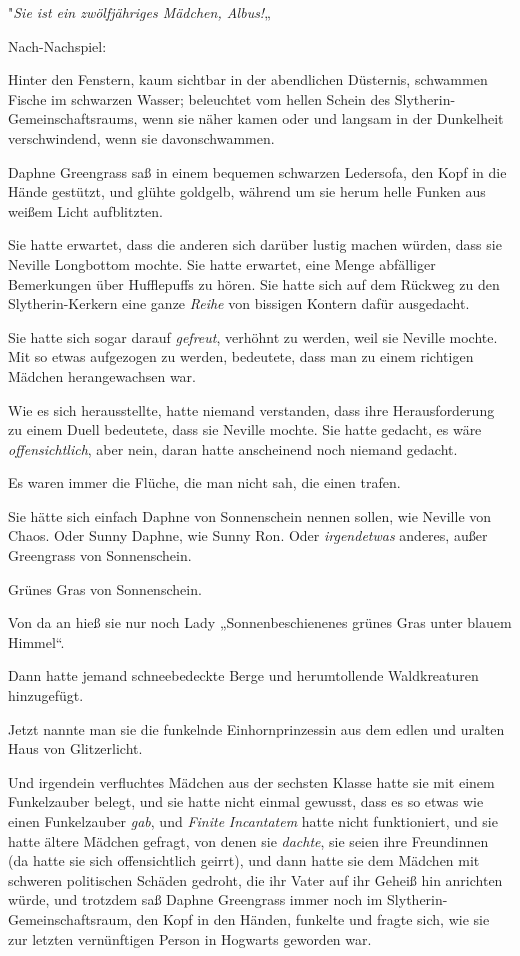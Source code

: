 {"\emph{Sie ist ein zwölfjähriges Mädchen, Albus!}„

Nach-Nachspiel:

Hinter den Fenstern, kaum sichtbar in der abendlichen Düsternis, schwammen Fische im schwarzen Wasser; beleuchtet vom hellen Schein des Slytherin-Gemeinschaftsraums, wenn sie näher kamen oder und langsam in der Dunkelheit verschwindend, wenn sie davonschwammen.

Daphne Greengrass saß in einem bequemen schwarzen Ledersofa, den Kopf in die Hände gestützt, und glühte goldgelb, während um sie herum helle Funken aus weißem Licht aufblitzten.

Sie hatte erwartet, dass die anderen sich darüber lustig machen würden, dass sie Neville Longbottom mochte. Sie hatte erwartet, eine Menge abfälliger Bemerkungen über Hufflepuffs zu hören. Sie hatte sich auf dem Rückweg zu den Slytherin-Kerkern eine ganze \emph{Reihe} von bissigen Kontern dafür ausgedacht.

Sie hatte sich sogar darauf \emph{gefreut}, verhöhnt zu werden, weil sie Neville mochte. Mit so etwas aufgezogen zu werden, bedeutete, dass man zu einem richtigen Mädchen herangewachsen war.

Wie es sich herausstellte, hatte niemand verstanden, dass ihre Herausforderung zu einem Duell bedeutete, dass sie Neville mochte. Sie hatte gedacht, es wäre \emph{offensichtlich}, aber nein, daran hatte anscheinend noch niemand gedacht.

Es waren immer die Flüche, die man nicht sah, die einen trafen.

Sie hätte sich einfach Daphne von Sonnenschein nennen sollen, wie Neville von Chaos. Oder Sunny Daphne, wie Sunny Ron. Oder \emph{irgendetwas} anderes, außer Greengrass von Sonnenschein.

Grünes Gras von Sonnenschein.

Von da an hieß sie nur noch Lady „Sonnenbeschienenes grünes Gras unter blauem Himmel“.

Dann hatte jemand schneebedeckte Berge und herumtollende Waldkreaturen hinzugefügt.

Jetzt nannte man sie die funkelnde Einhornprinzessin aus dem edlen und uralten Haus von Glitzerlicht.

Und irgendein verfluchtes Mädchen aus der sechsten Klasse hatte sie mit einem Funkelzauber belegt, und sie hatte nicht einmal gewusst, dass es so etwas wie einen Funkelzauber \emph{gab}, und \emph{Finite} \emph{Incantatem} hatte nicht funktioniert, und sie hatte ältere Mädchen gefragt, von denen sie \emph{dachte}, sie seien ihre Freundinnen (da hatte sie sich offensichtlich geirrt), und dann hatte sie dem Mädchen mit schweren politischen Schäden gedroht, die ihr Vater auf ihr Geheiß hin anrichten würde, und trotzdem saß Daphne Greengrass immer noch im Slytherin-Gemeinschaftsraum, den Kopf in den Händen, funkelte und fragte sich, wie sie zur letzten vernünftigen Person in Hogwarts geworden war.

}
